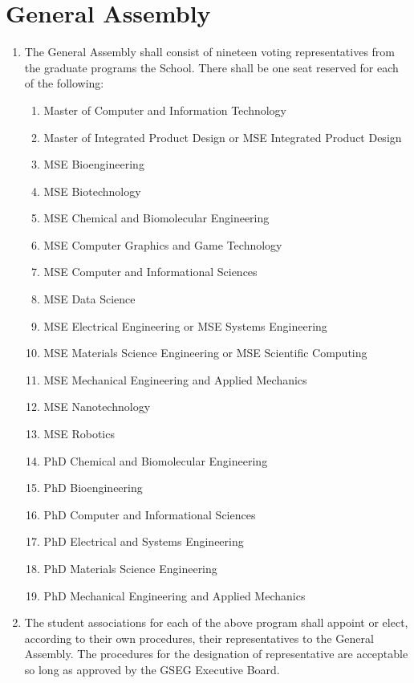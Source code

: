 \chapter{General Assembly}
\label{art:assembly}

\begin{enumerate}[label=\Alph*.]

	\item The General Assembly shall consist of nineteen voting representatives from the graduate programs the School. There shall be one seat reserved for each of the following:
	\begin{enumerate}[label=(\roman*)]
		\item Master of Computer and Information Technology
		\item Master of Integrated Product Design or MSE Integrated Product Design
		\item MSE Bioengineering
		\item MSE Biotechnology
		\item MSE Chemical and Biomolecular Engineering
		\item MSE Computer Graphics and Game Technology
		\item MSE Computer and Informational Sciences
		\item MSE Data Science
		\item MSE Electrical Engineering or MSE Systems Engineering
		\item MSE Materials Science Engineering or MSE Scientific Computing
		\item MSE Mechanical Engineering and Applied Mechanics
		\item MSE Nanotechnology
		\item MSE Robotics
		\item PhD Chemical and Biomolecular Engineering
		\item PhD Bioengineering
		\item PhD Computer and Informational Sciences
		\item PhD Electrical and Systems Engineering
		\item PhD Materials Science Engineering
		\item PhD Mechanical Engineering and Applied Mechanics
	\end{enumerate}

	\item The student associations for each of the above program shall appoint or elect, according
	to their own procedures, their representatives to the General Assembly. The procedures for the
	designation of representative are acceptable so long as approved by the GSEG Executive Board.


\end{enumerate}
